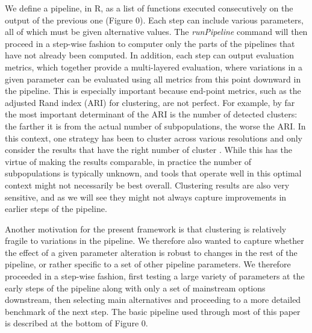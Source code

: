 \documentclass{bmcart}
\begin{document}
We define a pipeline, in R, as a list of functions executed consecutively on the output of the previous one (Figure 0). Each step can include various parameters, all of which must be given alternative values. The \textit{runPipeline} command will then proceed in a step-wise fashion to computer only the parts of the pipelines that have not already been computed. In addition, each step can output evaluation metrics, which together provide a multi-layered evaluation, where variations in a given parameter can be evaluated using all metrics from this point downward in the pipeline. This is especially important because end-point metrics, such as the adjusted Rand index (ARI) for clustering, are not perfect. For example, by far the most important determinant of the ARI is the number of detected clusters: the farther it is from the actual number of subpopulations, the worse the ARI. In this context, one strategy has been to cluster across various resolutions and only consider the results that have the right number of cluster \citep{duoClustering2018}. While this has the virtue of making the results comparable, in practice the number of subpopulations is typically unknown, and tools that operate well in this optimal context might not necessarily be best overall. Clustering results are also very sensitive, and as we will see they might not always capture improvements in earlier steps of the pipeline.

Another motivation for the present framework is that clustering is relatively fragile to variations in the pipeline. We therefore also wanted to capture whether the effect of a given parameter alteration is robust to changes in the rest of the pipeline, or rather specific to a set of other pipeline parameters. We therefore proceeded in a step-wise fashion, first testing a large variety of parameters at the early steps of the pipeline along with only a set of mainstream options downstream, then selecting main alternatives and proceeding to a more detailed benchmark of the next step. The basic pipeline used through most of this paper is described at the bottom of Figure 0.
\end{document}
